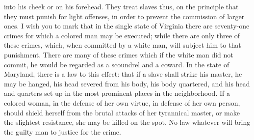 into his cheek or on his forehead. They treat slaves thus, on the
principle that they must punish for light offenses, in order to prevent
the commission of larger ones. I wish you to mark that in the single
state of Virginia there are seventy-one crimes for which a colored man
may be executed; while there are only three of these crimes, which, when
committed by a white man, will subject him to that punishment. There are
many of these crimes which if the white man did not commit, he would be
regarded as a scoundrel and a coward. In the state of Maryland, there is
a law to this effect: that if a slave shall strike his master, he may be
hanged, his head severed from his body, his body quartered, and his head
and quarters set up in the most prominent places in the neighborhood. If
a colored woman, in the defense of her own virtue, in defense of her own
person, should shield {}herself from the brutal attacks of her
tyrannical master, or make the slightest resistance, she may be killed
on the spot. No law whatever will bring the guilty man to justice for
the crime.

